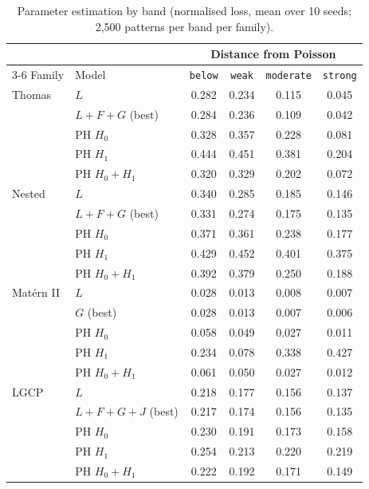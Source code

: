 \begin{table}[H]
\centering\small
\begin{tabular}{@{}ll cccc@{}}
\toprule
 & & \multicolumn{4}{c}{Distance from Poisson}\\
\cmidrule(l){3-6}
Family & Model & \texttt{below} & \texttt{weak} & \texttt{moderate} & \texttt{strong}\\
\midrule
Thomas & $L$ & 0.282 & 0.234 & 0.115 & 0.045\\
 & $L{+}F{+}G$ (best) & 0.284 & 0.236 & 0.109 & 0.042\\
 & PH $H_0$ & 0.328 & 0.357 & 0.228 & 0.081\\
 & PH $H_1$ & 0.444 & 0.451 & 0.381 & 0.204\\
 & PH $H_0{+}H_1$ & 0.320 & 0.329 & 0.202 & 0.072\\
\midrule
Nested & $L$ & 0.340 & 0.285 & 0.185 & 0.146\\
 & $L{+}F{+}G$ (best) & 0.331 & 0.274 & 0.175 & 0.135\\
 & PH $H_0$ & 0.371 & 0.361 & 0.238 & 0.177\\
 & PH $H_1$ & 0.429 & 0.452 & 0.401 & 0.375\\
 & PH $H_0{+}H_1$ & 0.392 & 0.379 & 0.250 & 0.188\\
\midrule
Mat\'ern II & $L$ & 0.028 & 0.013 & 0.008 & 0.007\\
 & $G$ (best) & 0.028 & 0.013 & 0.007 & 0.006\\
 & PH $H_0$ & 0.058 & 0.049 & 0.027 & 0.011\\
 & PH $H_1$ & 0.234 & 0.078 & 0.338 & 0.427\\
 & PH $H_0{+}H_1$ & 0.061 & 0.050 & 0.027 & 0.012\\
\midrule
LGCP & $L$ & 0.218 & 0.177 & 0.156 & 0.137\\
 & $L{+}F{+}G{+}J$ (best) & 0.217 & 0.174 & 0.156 & 0.135\\
 & PH $H_0$ & 0.230 & 0.191 & 0.173 & 0.158\\
 & PH $H_1$ & 0.254 & 0.213 & 0.220 & 0.219\\
 & PH $H_0{+}H_1$ & 0.222 & 0.192 & 0.171 & 0.149\\
\bottomrule
\end{tabular}
\caption{Parameter estimation by band (normalised loss, mean over 10 seeds; 2{,}500 patterns per band per family).}
\label{tab:params-delta}
\end{table}
